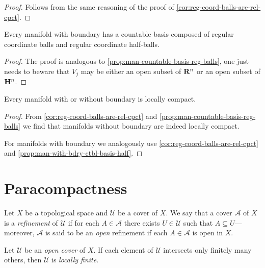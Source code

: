 \begin{proof}
Follows from the same reasoning of the proof of
\cref{cor:reg-coord-balls-are-rel-cpct}.
\end{proof}

\begin{proposition}
\label{prop:man-with-bdry-ctbl-basis-half}
Every manifold with boundary has a countable basis composed of regular
coordinate balls and regular coordinate half-balls.
\end{proposition}

\begin{proof}
The proof is analogous to \cref{prop:man-countable-basis-reg-balls}, one just
needs to beware that \(V_j\) may be either an open subset of \(\mathbf{R}^n\) or an open
subset of \(\mathbf{H}^n\).
\end{proof}

\begin{proposition}
\label{prop:manifold-locally-compact}
Every manifold with or without boundary is locally compact.
\end{proposition}

\begin{proof}
From \cref{cor:reg-coord-balls-are-rel-cpct} and
\cref{prop:man-countable-basis-reg-balls} we find that manifolds without
boundary are indeed locally compact.

For manifolds with boundary we analogously use
\cref{cor:reg-coord-balls-are-rel-cpct} and
\cref{prop:man-with-bdry-ctbl-basis-half}.
\end{proof}


\section{Paracompactness}

\begin{definition}
\label{def:cover-refinement}
Let \(X\) be a topological space and \(\mathcal{U}\) be a cover of
\(X\). We say that a cover \(\mathcal{A}\) of \(X\) is a \emph{refinement} of
\(\mathcal{U}\) if for each \(A \in \mathcal{A}\) there exists
\(U \in \mathcal{U}\) such that \(A \subseteq U\)---moreover, \(\mathcal{A}\)
is said to be an \emph{open} refinement if each \(A \in \mathcal{A}\) is open in
\(X\).
\end{definition}

\begin{corollary}
\label{cor:open-cover-finite-intersection-is-locally-finite}
Let \(\mathcal{U}\) be an \emph{open cover} of \(X\). If each element of
\(\mathcal{U}\) intersects only finitely many others, then \(\mathcal{U}\) is
\emph{locally finite}.
\end{corollary}

